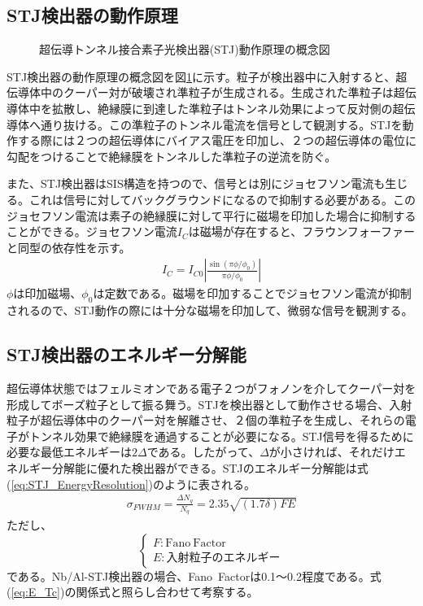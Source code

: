	\subsection{STJ検出器の動作原理}
		\begin{figure}[htbp]
  			\begin{center}
    				\caption{超伝導トンネル接合素子光検出器(STJ)動作原理の概念図}
    				\label{fig:STJ_WorkingPrinciple}
  			\end{center}
		\end{figure}
		STJ検出器の動作原理の概念図を図\ref{fig:STJ_WorkingPrinciple}に示す。粒子が検出器中に入射すると、超伝導体中のクーパー対が破壊され準粒子が生成される。生成された準粒子は超伝導体中を拡散し、絶縁膜に到達した準粒子はトンネル効果によって反対側の超伝導体へ通り抜ける。この準粒子のトンネル電流を信号として観測する。STJを動作する際には２つの超伝導体にバイアス電圧を印加し、２つの超伝導体の電位に勾配をつけることで絶縁膜をトンネルした準粒子の逆流を防ぐ。
		
		また、STJ検出器はSIS構造を持つので、信号とは別にジョセフソン電流も生じる。これは信号に対してバックグラウンドになるので抑制する必要がある。このジョセフソン電流は素子の絶縁膜に対して平行に磁場を印加した場合に抑制することができる。ジョセフソン電流$I_C$は磁場が存在すると、フラウンフォーファーと同型の依存性を示す。
		\begin{eqnarray}
			I_{C} = I_{C0} \left| \frac{\sin (\pi \phi / \phi_0)}{\pi \phi / \phi_0} \right|
		\end{eqnarray}
		$\phi$は印加磁場、$\phi_0$は定数である。磁場を印加することでジョセフソン電流が抑制されるので、STJ動作の際には十分な磁場を印加して、微弱な信号を観測する。
	
	\subsection{STJ検出器のエネルギー分解能}
		超伝導体状態ではフェルミオンである電子２つがフォノンを介してクーパー対を形成してボーズ粒子として振る舞う。STJを検出器として動作させる場合、入射粒子が超伝導体中のクーパー対を解離させ、２個の準粒子を生成し、それらの電子がトンネル効果で絶縁膜を通過することが必要になる。STJ信号を得るために必要な最低エネルギーは$2\Delta$である。したがって、$\Delta$が小さければ、それだけエネルギー分解能に優れた検出器ができる。STJのエネルギー分解能は式(\ref{eq:STJ_EnergyResolution})のように表される。
		\begin{eqnarray}
			\sigma_{FWHM} = \frac{\Delta N_q}{N_q} = 2.35 \sqrt{(1.7 \delta) FE}
			\label{eq:STJ_EnergyResolution}
		\end{eqnarray}
		ただし、
		\[
		\begin{cases}
			F : \mathrm{Fano\ Factor} \\
			E : \mathrm{入射粒子のエネルギー}
		\end{cases}
		\]
		である。Nb/Al-STJ検出器の場合、Fano\ Factorは0.1〜0.2程度である。式(\ref{eq:E_Tc})の関係式と照らし合わせて考察する。
		
